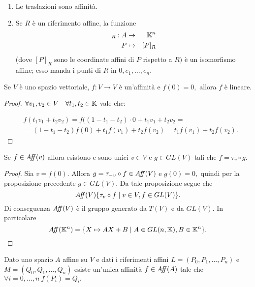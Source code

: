 \begin{example}
 \begin{enumerate}[label=\bf\Roman*)]
  \item Le traslazioni sono affinità.
  \item Se $R$ è un riferimento affine, la funzione
   \begin{eqnarray*}
  [\quad]_R:A & \to & \K^n \\
  P & \mapsto & [P]_R
 \end{eqnarray*}
  (dove $[P]_R$ sono le coordinate affini di $P$ rispetto a $R)$ è un isomorfismo affine;
 esso manda i punti di $R$ in $0,e_1,\ldots,e_n.$
 \end{enumerate}
 \end{example}
 
 \begin{proposition}
 Se $V$ è uno spazio vettoriale, $f:V\to V$ è un'affinità e $f(0)=0,$ allora
 $f$ è lineare.
 \end{proposition}
 \begin{proof}
 $\forall v_1,v_2\in V\quad\forall t_1,t_2\in \mathbb K$ vale che:
 
 \begin{eqnarray*}
	& f(t_1v_1+t_2v_2)=f((1-t_1-t_2)\cdotp 0+t_1v_1+t_2v_2=\\
	& =(1-t_1-t_2)f(0)+t_1f(v_1)+t_2f(v_2)=t_1f(v_1)+t_2f(v_2).
 \end{eqnarray*}
 \end{proof}
 
 \begin{proposition}
 Se $f\in A\!f\!\!f(v)$ allora esistono e sono unici $v\in V$ e $g\in GL(V)$ tali che
 $f=\tau_v\circ g.$
 \end{proposition}
 
 \begin{proof}
 Sia $v=f(0).$ Allora $g=\tau_{-v}\circ f\in A\!f\!\!f(V)$ e $g(0)=0,$
 quindi per la proposizione precedente $g\in GL(V).$
 Da tale proposizione segue che 
 \[
	A\!f\!\!f(V)\{\tau_v\circ f\;|\;v\in V,f\in GL(V)\}.
 \]
 Di conseguenza $A\!f\!\!f(V)$ è il gruppo generato da $T(V)$ e da $GL(V).$
 In particolare 
 \[
	A\!f\!\!f(\mathbb K^n)=\{X\mapsto AX+B \; |\; A\in GL(n,\mathbb K),B\in \mathbb K^n\}.
 \]
 \end{proof}
 
\begin{proposition}
Dato uno spazio $A$ affine su $V$ e dati i riferimenti affini $L=(P_0,P_1,\ldots,P_n)$
 e $M=(Q_0,Q_1,\ldots,Q_n)$ esiste un'unica affinità $f\in A\!f\!\!f(A)$ tale che
 $\forall i=0,\ldots,n\ f(P_i)=Q_i.$
 \end{proposition}
 
